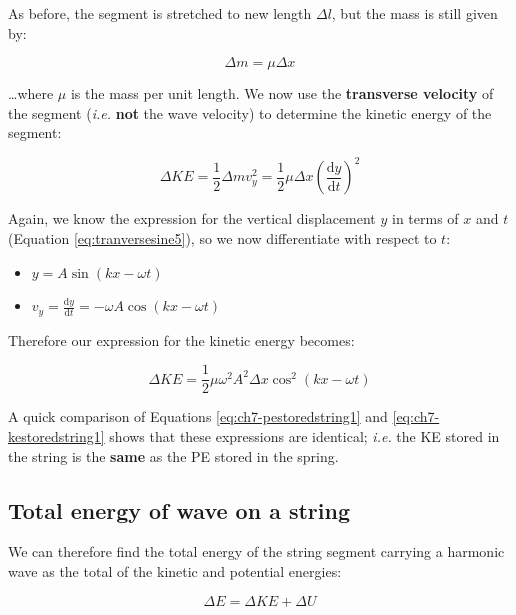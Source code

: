 \documentclass[
]{book}
\providecommand{\tightlist}{%
  \setlength{\itemsep}{0pt}\setlength{\parskip}{0pt}}
\begin{document}
As before, the segment is stretched to new length \(\Delta l\), but the mass is still given by:

\begin{equation}
\Delta m = \mu \Delta x
\end{equation}

\ldots where \(\mu\) is the mass per unit length. We now use the \textbf{transverse velocity} of the segment (\emph{i.e.} \textbf{not} the wave velocity) to determine the kinetic energy of the segment:

\begin{equation}
\Delta KE = \frac{1}{2} \Delta m v_y^2 = \frac{1}{2} \mu \Delta x \left( \frac{\mathrm{d}y}{\mathrm{d}t} \right)^2
\end{equation}

Again, we know the expression for the vertical displacement \(y\) in terms of \(x\) and \(t\) (Equation \eqref{eq:tranversesine5}), so we now differentiate with respect to \(t\):

\begin{itemize}
\tightlist
\item
  \(y = A \sin(kx - \omega t)\)
\item
  \(v_y = \frac{\mathrm{d}y}{\mathrm{d}t} = -\omega A \cos(kx - \omega t)\)
\end{itemize}

Therefore our expression for the kinetic energy becomes:

\begin{equation}
\Delta KE =  \frac{1}{2} \mu \omega^2  A^2 \Delta x  \cos^2(kx - \omega t)
\label{eq:ch7-kestoredstring1}
\end{equation}

A quick comparison of Equations \eqref{eq:ch7-pestoredstring1} and \eqref{eq:ch7-kestoredstring1} shows that these expressions are identical; \emph{i.e.} the KE stored in the string is the \textbf{same} as the PE stored in the spring.

\hypertarget{sec-ch7-totenergystringsegment}{%
\subsection{Total energy of wave on a string}\label{sec-ch7-totenergystringsegment}}

We can therefore find the total energy of the string segment carrying a harmonic wave as the total of the kinetic and potential energies:

\begin{equation}
\Delta E = \Delta KE + \Delta U
\end{equation}
\end{document}
